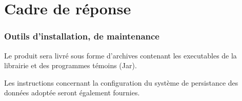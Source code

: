 \section{Cadre de réponse}





%

\subsubsection{Outils d’installation, de maintenance}

Le produit sera livré sous forme d'archives contenant les executables de la librairie et des programmes témoins (Jar).

Les instructions concernant la configuration du système de persistance des données adoptée seront
également fournies.


